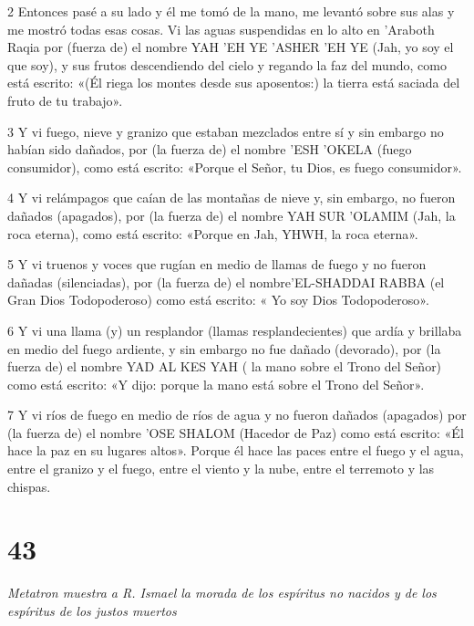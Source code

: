 \par 2 Entonces pasé a su lado y él me tomó de la mano, me levantó sobre sus alas y me mostró todas esas cosas. Vi las aguas suspendidas en lo alto en 'Araboth Raqia por (fuerza de) el nombre YAH 'EH YE 'ASHER 'EH YE (Jah, yo soy el que soy), y sus frutos descendiendo del cielo y regando la faz del mundo, como está escrito: «(Él riega los montes desde sus aposentos:) la tierra está saciada del fruto de tu trabajo».

\par 3 Y vi fuego, nieve y granizo que estaban mezclados entre sí y sin embargo no habían sido dañados, por (la fuerza de) el nombre 'ESH 'OKELA (fuego consumidor), como está escrito: «Porque el Señor, tu Dios, es fuego consumidor».

\par 4 Y vi relámpagos que caían de las montañas de nieve y, sin embargo, no fueron dañados (apagados), por (la fuerza de) el nombre YAH SUR 'OLAMIM (Jah, la roca eterna), como está escrito: «Porque en Jah, YHWH, la roca eterna».

\par 5 Y vi truenos y voces que rugían en medio de llamas de fuego y no fueron dañadas (silenciadas), por (la fuerza de) el nombre'EL-SHADDAI RABBA (el Gran Dios Todopoderoso) como está escrito: « Yo soy Dios Todopoderoso».

\par 6 Y vi una llama (y) un resplandor (llamas resplandecientes) que ardía y brillaba en medio del fuego ardiente, y sin embargo no fue dañado (devorado), por (la fuerza de) el nombre YAD AL KES YAH ( la mano sobre el Trono del Señor) como está escrito: «Y dijo: porque la mano está sobre el Trono del Señor».

\par 7 Y vi ríos de fuego en medio de ríos de agua y no fueron dañados (apagados) por (la fuerza de) el nombre 'OSE SHALOM (Hacedor de Paz) como está escrito: «Él hace la paz en su lugares altos». Porque él hace las paces entre el fuego y el agua, entre el granizo y el fuego, entre el viento y la nube, entre el terremoto y las chispas.

\chapter{43}

\par \textit{Metatron muestra a R. Ismael la morada de los espíritus no nacidos y de los espíritus de los justos muertos}


